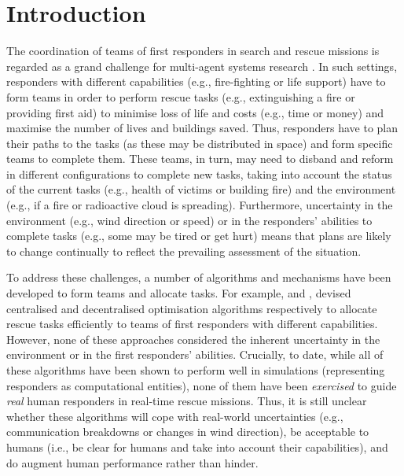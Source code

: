 \section{Introduction}
\noindent The coordination of teams of first responders in search and rescue missions is regarded as  a grand challenge for multi-agent systems research \cite{kitano:2001}. In such settings, responders with different capabilities (e.g., fire-fighting or life support) have to form teams in order to perform rescue tasks (e.g., extinguishing a fire or providing first aid) to minimise  loss of life and costs (e.g., time or money) and maximise the number of lives and buildings saved. Thus, responders have to plan their paths to the tasks (as these may be distributed in space) and form specific teams  to complete them. These teams, in turn, may  need to disband and reform in different configurations to complete new tasks, taking into account the status  of the current tasks  (e.g., health of victims or building fire) and the environment (e.g., if a fire or radioactive cloud is spreading). Furthermore, uncertainty in the environment (e.g., wind direction or speed) or in the responders' abilities to complete tasks (e.g., some may be tired or get hurt) means that plans are likely to change continually to reflect the prevailing assessment of the situation. 

To address these challenges, a number of algorithms and mechanisms have been developed to form teams and allocate tasks. For example, \cite{ramchurn:etal:2010,Scerri2005} and \cite{ramchurn:etal:2010b,Chapman2009}, devised centralised and decentralised optimisation algorithms respectively to allocate rescue tasks efficiently to teams of first responders with different capabilities. However, none of these approaches considered the inherent uncertainty in the environment or in the first responders' abilities. Crucially, to date, while all of these algorithms have been shown to perform well in simulations (representing responders as computational entities), none of them have been \emph{exercised} to guide \emph{real} human responders in real-time rescue missions. Thus, it is still unclear whether these algorithms will cope with real-world uncertainties (e.g., communication breakdowns or changes in wind direction), be acceptable to humans (i.e., be clear for humans and take into account their capabilities), and do augment  human performance rather than hinder.

